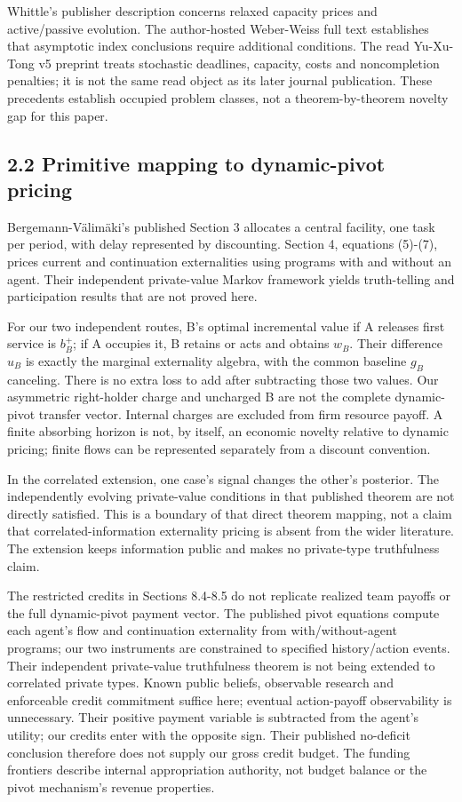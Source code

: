 \documentclass[
  11pt,
]{article}
\begin{document}
Whittle's publisher description concerns relaxed capacity prices and
active/passive evolution. The author-hosted Weber-Weiss full text
establishes that asymptotic index conclusions require additional
conditions. The read Yu-Xu-Tong v5 preprint treats stochastic deadlines,
capacity, costs and noncompletion penalties; it is not the same read
object as its later journal publication. These precedents establish
occupied problem classes, not a theorem-by-theorem novelty gap for this
paper.

\subsection{2.2 Primitive mapping to dynamic-pivot
pricing}\label{primitive-mapping-to-dynamic-pivot-pricing}

Bergemann-Välimäki's published Section 3 allocates a central facility,
one task per period, with delay represented by discounting. Section 4,
equations (5)-(7), prices current and continuation externalities using
programs with and without an agent. Their independent private-value
Markov framework yields truth-telling and participation results that are
not proved here.

For our two independent routes, B's optimal incremental value if A
releases first service is \(b_B^+\); if A occupies it, B retains or acts
and obtains \(w_B\). Their difference \(u_B\) is exactly the marginal
externality algebra, with the common baseline \(g_B\) canceling. There
is no extra loss to add after subtracting those two values. Our
asymmetric right-holder charge and uncharged B are not the complete
dynamic-pivot transfer vector. Internal charges are excluded from firm
resource payoff. A finite absorbing horizon is not, by itself, an
economic novelty relative to dynamic pricing; finite flows can be
represented separately from a discount convention.

In the correlated extension, one case's signal changes the other's
posterior. The independently evolving private-value conditions in that
published theorem are not directly satisfied. This is a boundary of that
direct theorem mapping, not a claim that correlated-information
externality pricing is absent from the wider literature. The extension
keeps information public and makes no private-type truthfulness claim.

The restricted credits in Sections 8.4-8.5 do not replicate realized
team payoffs or the full dynamic-pivot payment vector. The published
pivot equations compute each agent's flow and continuation externality
from with/without-agent programs; our two instruments are constrained to
specified history/action events. Their independent private-value
truthfulness theorem is not being extended to correlated private types.
Known public beliefs, observable research and enforceable credit
commitment suffice here; eventual action-payoff observability is
unnecessary. Their positive payment variable is subtracted from the
agent's utility; our credits enter with the opposite sign. Their
published no-deficit conclusion therefore does not supply our gross
credit budget. The funding frontiers describe internal appropriation
authority, not budget balance or the pivot mechanism's revenue
properties.
\end{document}

